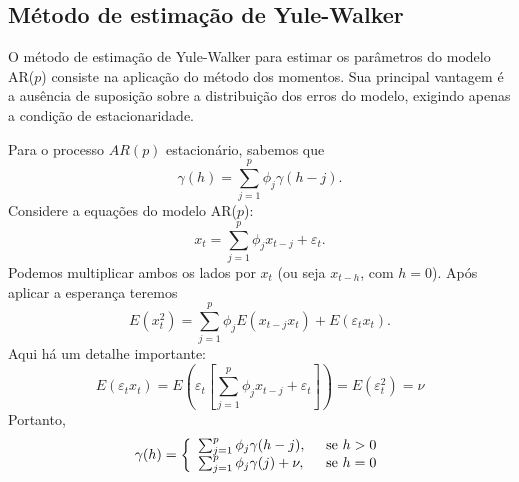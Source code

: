 \documentclass[
  letterpaper,
  DIV=11,
  numbers=noendperiod]{scrartcl}
\theoremstyle{plain}
\theoremstyle{plain}
\theoremstyle{definition}
\theoremstyle{definition}
\theoremstyle{remark}
\begin{document}
\hypertarget{muxe9todo-de-estimauxe7uxe3o-de-yule-walker}{%
\subsection{Método de estimação de
Yule-Walker}\label{muxe9todo-de-estimauxe7uxe3o-de-yule-walker}}

O método de estimação de Yule-Walker para estimar os parâmetros do
modelo AR(\(p\)) consiste na aplicação do método dos momentos. Sua
principal vantagem é a ausência de suposição sobre a distribuição dos
erros do modelo, exigindo apenas a condição de estacionaridade.

Para o processo \(AR(p)\) estacionário, sabemos que
\[\gamma(h) = \sum_{j=1}^p \phi_j \gamma( h-j).\] Considere a equações
do modelo AR(\(p\)):
\[x_t = \sum_{j=1}^p \phi_j x_{t-j}+\varepsilon_t.\] Podemos multiplicar
ambos os lados por \(x_t\) (ou seja \(x_{t-h}\), com \(h=0\)). Após
aplicar a esperança teremos
\[E(x_t^2) = \sum_{j=1}^p \phi_j E(x_{t-j}x_{t})+E(\varepsilon_tx_{t}).\]
Aqui há um detalhe importante:\\
\[E(\varepsilon_tx_{t})=E\left(\varepsilon_t\left[\sum_{j=1}^p \phi_j x_{t-j}+\varepsilon_t\right]\right)=E(\varepsilon_t^2)=\nu\]
Portanto, \[\begin{align}   
    \gamma(h)=\left\{\begin{array}{ll}
    \sum_{j=1}^p \phi_j \gamma( h-j),&\;\;\hbox{se }h>0\\
    \sum_{j=1}^p \phi_j \gamma( j)+\nu,&\;\;\hbox{se }h=0 \\
    \end{array}\right.
    \end{align}\]
\end{document}
